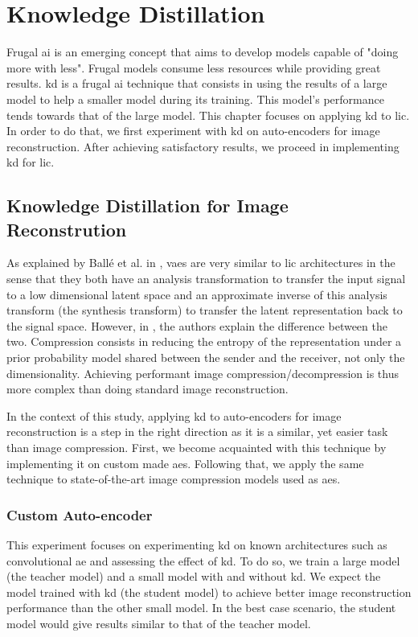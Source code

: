 \chapter{Knowledge Distillation}
\label{part_2}
Frugal \acrshort{ai} is an emerging concept that aims to develop models capable of "doing more with less". Frugal models consume less resources while providing great results. \acrfull{kd} is a frugal \acrshort{ai} technique that consists in using the results of a large model to help a smaller model during its training. This model's performance tends towards that of the large model. This chapter focuses on applying \acrshort{kd} to \acrshort{lic}. In order to do that, we first experiment with \acrshort{kd} on auto-encoders for image reconstruction. After achieving satisfactory results, we proceed in implementing \acrshort{kd} for \acrshort{lic}.

\section{Knowledge Distillation for Image Reconstrution}
As explained by Ballé et al. in \cite{ballé2018variationalimagecompressionscale}, \acrshort{vae}s are very similar to \acrshort{lic} architectures in the sense that they both have an analysis transformation to transfer the input signal to a low dimensional latent space and an approximate inverse of this analysis transform (the synthesis transform) to transfer the latent representation back to the signal space. However, in \cite{minnen2018jointautoregressivehierarchicalpriors}, the authors explain the difference between the two. Compression consists in reducing the entropy of the representation under a prior probability model shared between the sender and the receiver, not only the dimensionality. Achieving performant image compression/decompression is thus more complex than doing standard image reconstruction.

In the context of this study, applying \acrshort{kd} to auto-encoders for image reconstruction is a step in the right direction as it is a similar, yet easier task than image compression. First, we become acquainted with this technique by implementing it on custom made \acrfull{ae}s. Following that, we apply the same technique to state-of-the-art image compression models used as \acrshort{ae}s.

\subsection{Custom Auto-encoder}
This experiment focuses on experimenting \acrshort{kd} on known architectures such as convolutional \acrshort{ae} and assessing the effect of \acrshort{kd}. To do so, we train a large model (the teacher model) and a small model with and without \acrshort{kd}. We expect the model trained with \acrshort{kd} (the student model) to achieve better image reconstruction performance than the other small model. In the best case scenario, the student model would give results similar to that of the teacher model.

